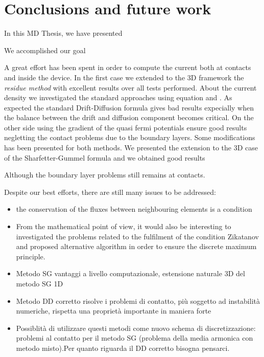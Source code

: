 \chapter{Conclusions and future work}


In this MD Thesis, we have presented 

We accomplished our goal

A great effort has been spent in order to compute the current both at contacts and inside the device. In the first case we extended to the 3D framework the \textit{residue method} with excellent results over all tests performed. About the current density we investigated the standard approaches using equation  and  . As expected the standard Drift-Diffusion formula gives bad results expecially when the balance between the drift and diffusion component becomes critical. On the other side using the gradient of the quasi fermi potentials ensure good results negletting the contact problems due to the boundary layers. Some modifications has been presented for both methods.
 We presented the extension to the 3D case of the Sharfetter-Gummel formula and we obtained good results
 
 Although the boundary layer problems still remains at contacts.






Despite our best efforts, there are still many issues to be addressed:
\begin{itemize}
\item the conservation of the fluxes between neighbouring elements is a condition 

\item From the mathematical point of view, it would also be interesting to investigated the problems related to the fulfilment of the condition Zikatanov and proposed alternative algorithm in order to ensure the discrete maximum principle.

\end{itemize}




\begin{itemize}
\item Metodo SG vantaggi a livello computazionale, estensione naturale 3D del metodo SG 1D
\item Metodo DD corretto risolve i problemi di contatto, pi\`u soggetto ad instabilit\`a numeriche, rispetta una propriet\`a importante in maniera forte
\item Possiblit\`a di utilizzare questi metodi come nuovo schema di discretizzazione: problemi al contatto per il metodo SG (problema della media armonica con metodo misto).Per quanto riguarda il DD corretto bisogna pensarci.
\end{itemize}